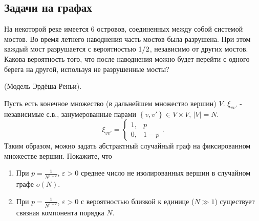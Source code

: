 \subsection{Задачи на графах}

\begin{problem}

На некоторой реке имеется 6 островов, соединенных между собой системой мостов. Во время летнего наводнения часть мостов была разрушена. При этом каждый мост разрушается с вероятностью ${1\mathord{\left/ {\vphantom {1 2}} \right. \kern-\nulldelimiterspace} 2} $, независимо от других мостов. Какова вероятность того, что после наводнения можно будет перейти с одного берега на другой, используя не разрушенные мосты?


\end{problem}

\begin{problem}

(Модель Эрдёша-Реньи).

 Пусть есть конечное множество (в дальнейшем множество вершин) $V$. $\xi _{vv'} $ - независимые с.в., занумерованные парами $\left\{v,v'\right\}\in V\times V$, $\vert V \vert = N$.
\[\xi _{vv'} =\left\{\begin{array}{cc} {1,} & {p} \\ {0,} & {1-p} \end{array}\right. .\] 
Таким образом, можно задать абстрактный случайный граф на фиксированном множестве вершин. Покажите, что 

\begin{enumerate}
\item  При $p=\frac{1}{N^{1+\varepsilon } } $, $\varepsilon >0$ среднее число не изолированных вершин в случайном графе $o\left(N\right)$.

\item  При $p=\frac{1}{N^{1-\varepsilon } } $, $\varepsilon >0$ с вероятностью близкой к единице ($N \gg 1$) существует связная компонента порядка $N$.
\end{enumerate}



\end{problem}

